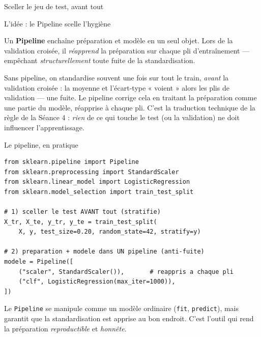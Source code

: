 \documentclass[aspectratio=169,11pt]{beamer}
\begin{document}
\begin{frame}{Sceller le jeu de test, avant tout}
\end{frame}

\begin{frame}{L'idée : le Pipeline scelle l'hygiène}
\begin{ucaddef}
{\small Un \textbf{Pipeline} enchaîne préparation et modèle en un seul objet. Lors de la validation croisée, il \emph{réapprend} la préparation sur chaque pli d'entraînement — empêchant \emph{structurellement} toute fuite de la standardisation.}
\end{ucaddef}
{\small Sans pipeline, on standardise souvent une fois sur tout le train, \emph{avant} la validation croisée : la moyenne et l'écart-type « voient » alors les plis de validation — une fuite. Le pipeline corrige cela en traitant la préparation comme une partie du modèle, réapprise à chaque pli. C'est la traduction technique de la règle de la Séance 4 : \emph{rien} de ce qui touche le test (ou la validation) ne doit influencer l'apprentissage.}
\end{frame}

\begin{frame}[fragile]{Le pipeline, en pratique}
\begin{lstlisting}
from sklearn.pipeline import Pipeline
from sklearn.preprocessing import StandardScaler
from sklearn.linear_model import LogisticRegression
from sklearn.model_selection import train_test_split

# 1) sceller le test AVANT tout (stratifie)
X_tr, X_te, y_tr, y_te = train_test_split(
    X, y, test_size=0.20, random_state=42, stratify=y)

# 2) preparation + modele dans UN pipeline (anti-fuite)
modele = Pipeline([
    ("scaler", StandardScaler()),       # reappris a chaque pli
    ("clf", LogisticRegression(max_iter=1000)),
])
\end{lstlisting}
{\small Le \texttt{Pipeline} se manipule comme un modèle ordinaire (\texttt{fit}, \texttt{predict}), mais garantit que la standardisation est apprise au bon endroit. C'est l'outil qui rend la préparation \emph{reproductible} et \emph{honnête}.}
\end{frame}
\end{document}
